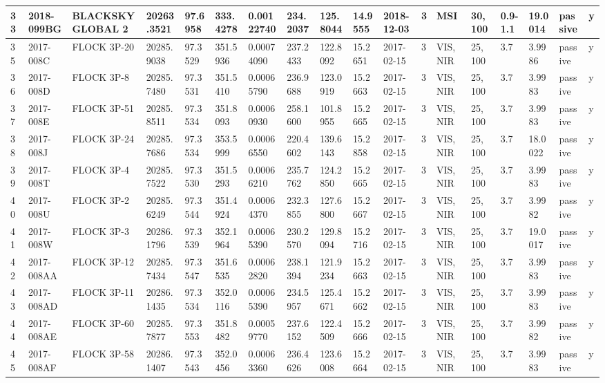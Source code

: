 \documentclass[12pt,a4paper,notitlepage,twoside,openright]{report}
\begin{document}
\begin{longtable}{|l|l|l|l|l|l|l|l|l|l|l|l|l|l|l|l|l|l|}
        33 & 2018-099BG & BLACKSKY GLOBAL 2 & 20263.3521 & 97.6958 & 333.4278 & 0.00122740 & 234.2037 & 125.8044 & 14.9555 & 2018-12-03 & 3 & MSI & 30, 100 & 0.9-1.1 & 19.0014 & passive & y \\ \hline
        35 & 2017-008C & FLOCK 3P-20 & 20285.9038 & 97.3529 & 351.5936 & 0.00074090 & 237.2433 & 122.8092 & 15.2651 & 2017-02-15 & 3 & VIS, NIR & 25, 100 & 3.7 & 3.9986 & passive & y \\ \hline
        36 & 2017-008D & FLOCK 3P-8 & 20285.7480 & 97.3531 & 351.5410 & 0.00065790 & 236.9688 & 123.0919 & 15.2663 & 2017-02-15 & 3 & VIS, NIR & 25, 100 & 3.7 & 3.9983 & passive & y \\ \hline
        37 & 2017-008E & FLOCK 3P-51 & 20285.8511 & 97.3534 & 351.8093 & 0.00060930 & 258.1600 & 101.8955 & 15.2665 & 2017-02-15 & 3 & VIS, NIR & 25, 100 & 3.7 & 3.9983 & passive & y \\ \hline
        38 & 2017-008J & FLOCK 3P-24 & 20285.7686 & 97.3534 & 353.5999 & 0.00066550 & 220.4602 & 139.6143 & 15.2858 & 2017-02-15 & 3 & VIS, NIR & 25, 100 & 3.7 & 18.0022 & passive & y \\ \hline
        39 & 2017-008T & FLOCK 3P-4 & 20285.7522 & 97.3530 & 351.5293 & 0.00066210 & 235.7762 & 124.2850 & 15.2665 & 2017-02-15 & 3 & VIS, NIR & 25, 100 & 3.7 & 3.9983 & passive & y \\ \hline
        40 & 2017-008U & FLOCK 3P-2 & 20285.6249 & 97.3544 & 351.4924 & 0.00064370 & 232.3855 & 127.6800 & 15.2667 & 2017-02-15 & 3 & VIS, NIR & 25, 100 & 3.7 & 3.9982 & passive & y \\ \hline
        41 & 2017-008W & FLOCK 3P-3 & 20286.1796 & 97.3539 & 352.1964 & 0.00065390 & 230.2570 & 129.8094 & 15.2716 & 2017-02-15 & 3 & VIS, NIR & 25, 100 & 3.7 & 19.0017 & passive & y \\ \hline
        42 & 2017-008AA & FLOCK 3P-12 & 20285.7434 & 97.3547 & 351.6535 & 0.00062820 & 238.1394 & 121.9234 & 15.2663 & 2017-02-15 & 3 & VIS, NIR & 25, 100 & 3.7 & 3.9983 & passive & y \\ \hline
        43 & 2017-008AD & FLOCK 3P-11 & 20286.1435 & 97.3534 & 352.0116 & 0.00065390 & 234.5957 & 125.4671 & 15.2662 & 2017-02-15 & 3 & VIS, NIR & 25, 100 & 3.7 & 3.9983 & passive & y \\ \hline
        44 & 2017-008AE & FLOCK 3P-60 & 20285.7877 & 97.3553 & 351.8482 & 0.00059770 & 237.6152 & 122.4509 & 15.2666 & 2017-02-15 & 3 & VIS, NIR & 25, 100 & 3.7 & 3.9982 & passive & y \\ \hline
        45 & 2017-008AF & FLOCK 3P-58 & 20286.1407 & 97.3543 & 352.0456 & 0.00063360 & 236.4626 & 123.6008 & 15.2664 & 2017-02-15 & 3 & VIS, NIR & 25, 100 & 3.7 & 3.9983 & passive & y \\ \hline

\end{longtable}
\end{document}
